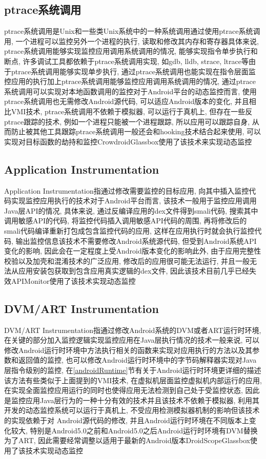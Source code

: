 \subsection{ptrace系统调用}
ptrace系统调用是Unix和一些类Unix系统中的一种系统调用\juhao 通过使用ptrace系统调用, 一个进程可以监控另外一个进程的执行, 读取和修改其内存和寄存器\juhao 具体来说, ptrace系统调用能够实现监控应用调用系统调用的情况, 能够实现指令单步执行和断点, 许多调试工具都依赖于ptrace系统调用实现, 如gdb, lldb, strace, ltrace等\juhao 由于ptrace系统调用能够实现单步执行, 通过ptrace系统调用也能实现在指令层面监控应用的执行\juhao 加上ptrace系统调用能够监控应用调用系统调用的情况, 通过ptrace系统调用可以实现对本地函数调用的监控\juhao 对于Android平台的动态监控而言, 使用ptrace系统调用也无需修改Android源代码, 可以适应Android版本的变化, 并且相比VMI技术, ptrace系统调用不依赖于模拟器, 可以运行于真机上, 但存在一些反ptrace跟踪的技术, 例如一个进程只能被一个进程跟踪, 所以应用可以跟踪自身, 从而防止被其他工具跟踪\juhao ptrace系统调用一般还会和hooking技术结合起来使用, 可以实现对目标函数的劫持和监控\juhao Crowdroid\dunhao Glassbox使用了该技术来实现动态监控\juhao

\subsection{Application Instrumentation}
Application Instrumentation指通过修改需要监控的目标应用, 向其中插入监控代码实现监控应用执行的技术\juhao 对于Android平台而言, 该技术一般用于监控应用调用Java层API的情况, 具体来说, 通过反编译应用的dex文件得到smali代码, 搜索其中调用敏感API的代码, 将监控代码插入调用敏感API代码的周围, 再将修改后的smali代码编译重新打包成包含监控代码的应用, 这样在应用执行时就会执行监控代码, 输出监控信息\juhao 该技术不需要修改Android系统源代码, 但受到Android系统API变化的影响, 因此会在一定程度上受Android版本变化的影响\juhao 此外, 由于应用完整性校验以及加壳和混淆技术的广泛应用, 修改后的应用很可能无法运行, 并且一般无法从应用安装包获取到包含应用真实逻辑的dex文件, 因此该技术目前几乎已经失效\juhao APIMonitor使用了该技术实现动态监控\juhao

\subsection{DVM/ART Instrumentation}
DVM/ART Instrumentation指通过修改Android系统的DVM或者ART运行时环境, 在关键的部分加入监控逻辑实现监控应用在Java层执行情况的技术\juhao 一般来说, 可以修改Android运行时环境中方法执行相关的函数来实现对应用执行的方法以及其参数和返回值的监控, 也可以修改Android运行时环境中的字节码解释器实现对Java层指令级别的监控, 在\ref{androidRuntime}节有关于Android运行时环境更详细的描述\juhao 该方法有些类似于上面提到的VMI技术, 在虚拟机层面监控虚拟机内部运行的应用, 在实现全面监控应用运行的同时也使得应用无法检测到自己处于受监控状态, 因此是监控应用Java层行为的一种十分有效的技术\juhao 并且该技术不依赖于模拟器, 利用其开发的动态监控系统可以运行于真机上, 不受应用检测模拟器机制的影响\juhao 但该技术的实现依赖于对
Android源代码的修改, 并且Android运行时环境在不同版本上变化较大, 特别是Android5.0之前和Android5.0之后Android运行时环境有DVM替换为了ART, 因此需要经常调整以适用于最新的Android版本\juhao DroidScope\dunhao Glassbox使用了该技术实现动态监控\juhao

